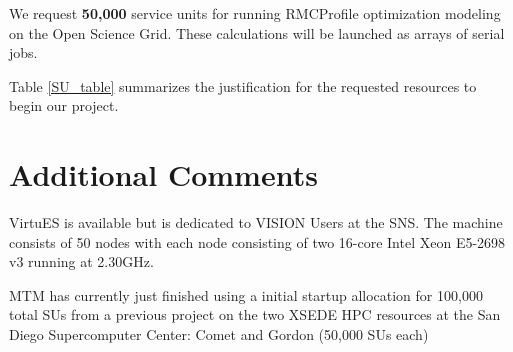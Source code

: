 \documentclass{proposalnsf}
\begin{document}
We request \textbf{50,000} service units for running RMCProfile optimization modeling on the Open Science Grid. These calculations will be launched as arrays of serial jobs.

Table \ref{SU_table} summarizes the justification for the requested resources to begin our project.

\begin{table}[H]
  \caption{Summary of requested service units for projects}\label{SU_table}
\end{table}


\section*{Additional Comments}
VirtuES is available but is dedicated to VISION Users at the SNS. The machine consists of 50 nodes with each node consisting of two 16-core Intel Xeon E5-2698 v3 running at 2.30GHz.  

MTM has currently just finished using a initial startup allocation for 100,000 total SUs from a previous project on the two XSEDE HPC resources at the San Diego Supercomputer Center: Comet and Gordon (50,000 SUs each)




\end{document}
